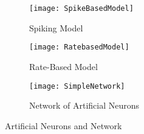 \begin{figure}
\centering
\begin{subfigure}{.4\textwidth}
  \centering
  \texttt{[image: SpikeBasedModel]}
  \captionsetup{justification=centering, skip=5pt}
  \caption[Spiking Model]{Spiking Model}
  \label{fig:Spiking Model}
\end{subfigure}%
\begin{subfigure}{.4\textwidth}
  \centering
  \texttt{[image: RatebasedModel]}
  \captionsetup{justification=centering, skip=5pt}
  \caption{Rate-Based Model}
  \label{fig:Rate Based Model}
\end{subfigure}
\begin{subfigure}{.9\textwidth}
  \centering
  \texttt{[image: SimpleNetwork]}
  \captionsetup{justification=centering, skip=5pt}
  \caption{Network of Artificial Neurons}
  \label{fig:Network of ANs}
\end{subfigure}
\captionsetup{justification=centering, skip=6pt}
\caption[Artificial Neural Network]{Artificial Neurons and Network \cite{NNintro_Bullinaria}\cite{NNintro_Nielsen}}
\label{fig:Artificial Neural Network}
\end{figure}


